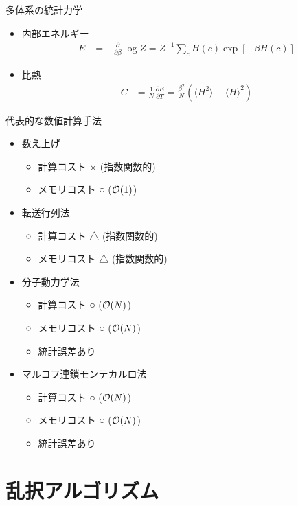 \documentclass[dvipdfmx]{beamer}
\begin{document}
\begin{frame}[t,fragile]{多体系の統計力学}
  \begin{itemize}
    \setlength{\itemsep}{1em}
  \item 内部エネルギー
    \begin{align*}
      E &= -\frac{\partial}{\partial\beta} \log Z = Z^{-1} \sum_c H(c) \exp [- \beta H(c) ]
    \end{align*}
  \item 比熱
    \begin{align*}
      C &= \frac{1}{N} \frac{\partial E}{\partial T} = \frac{\beta^2}{N} (\langle H^2 \rangle - \langle H \rangle^2)
    \end{align*}
  \end{itemize}
\end{frame}

\begin{frame}[t,fragile]{代表的な数値計算手法}
  \begin{itemize}
  \item 数え上げ
    \begin{itemize}
      \item 計算コスト × (指数関数的)
      \item メモリコスト ○ (${\cal O}(1)$)
    \end{itemize}
  \item 転送行列法
    \begin{itemize}
      \item 計算コスト △ (指数関数的)
      \item メモリコスト △ (指数関数的)
    \end{itemize}
  \item 分子動力学法
    \begin{itemize}
      \item 計算コスト ○ (${\cal O}(N)$)
      \item メモリコスト ○ (${\cal O}(N)$)
      \item 統計誤差あり
    \end{itemize}
  \item {\color{red}マルコフ連鎖モンテカルロ法}
    \begin{itemize}
      \item 計算コスト ○ (${\cal O}(N)$)
      \item メモリコスト ○ (${\cal O}(N)$)
      \item 統計誤差あり
    \end{itemize}
  \end{itemize}
\end{frame}

\section{乱択アルゴリズム}








\end{document}
